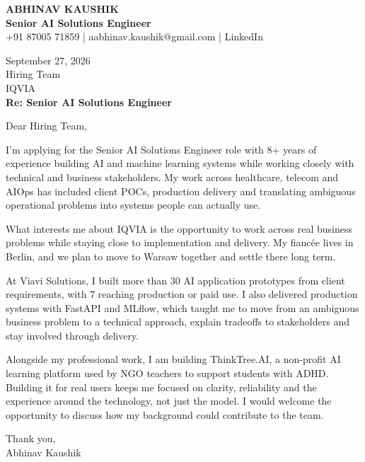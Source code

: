 \documentclass[10pt,a4paper]{article}
\begin{document}
\begin{center}
{\Large\bfseries ABHINAV KAUSHIK}\\[2pt]
{\bfseries Senior AI Solutions Engineer}\\[2pt]
+91 87005 71859 \quad | \quad aabhinav.kaushik@gmail.com \quad | \quad LinkedIn
\end{center}
\vspace{8pt}
September 27, 2026\\[6pt]
Hiring Team\\
IQVIA\\[4pt]
\textbf{Re: Senior AI Solutions Engineer}

Dear Hiring Team,

I’m applying for the Senior AI Solutions Engineer role with 8+ years of experience building AI and machine learning systems while working closely with technical and business stakeholders. My work across healthcare, telecom and AIOps has included client POCs, production delivery and translating ambiguous operational problems into systems people can actually use.

What interests me about IQVIA is the opportunity to work across real business problems while staying close to implementation and delivery. My fiancée lives in Berlin, and we plan to move to Warsaw together and settle there long term.

At Viavi Solutions, I built more than 30 AI application prototypes from client requirements, with 7 reaching production or paid use. I also delivered production systems with FastAPI and MLflow, which taught me to move from an ambiguous business problem to a technical approach, explain tradeoffs to stakeholders and stay involved through delivery.

Alongside my professional work, I am building ThinkTree.AI, a non-profit AI learning platform used by NGO teachers to support students with ADHD. Building it for real users keeps me focused on clarity, reliability and the experience around the technology, not just the model. I would welcome the opportunity to discuss how my background could contribute to the team.

Thank you,\\
Abhinav Kaushik
\end{document}
